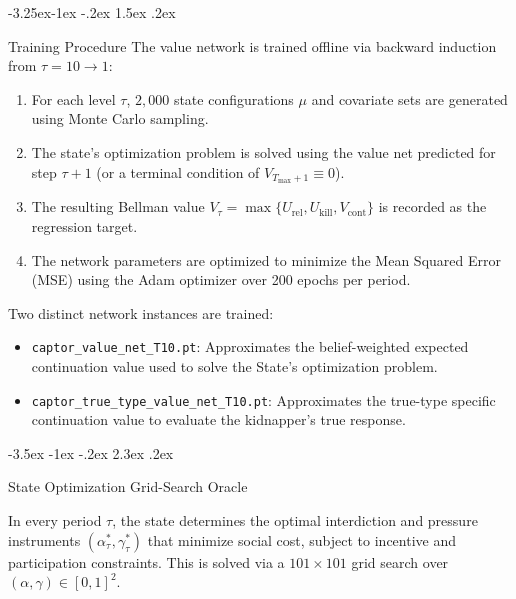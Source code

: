 \documentclass[12pt]{article}
\makeatletter
\newcommand{\pyfile}[1]{\texttt{#1}}
\numberwithin{equation}{section}
\numberwithin{table}{section}
\renewcommand\section{\@startsection {section}{1}{\z@}%
                                   {-3.5ex \@plus -1ex \@minus -.2ex}%
                                   {2.3ex \@plus.2ex}%
                                   {\normalfont\Large\bfseries\raggedright}}
\renewcommand\subsection{\@startsection{subsection}{2}{\z@}%
                                     {-3.25ex\@plus -1ex \@minus -.2ex}%
                                     {1.5ex \@plus .2ex}%
                                     {\normalfont\large\bfseries\raggedright}}
\makeatother
\begin{document}
\subsection{Training Procedure}
The value network is trained offline via backward induction from $\tau = 10 \to 1$:
\begin{enumerate}
    \item For each level $\tau$, $2,000$ state configurations $\mu$ and covariate sets are generated using Monte Carlo sampling.
    \item The state's optimization problem is solved using the value net predicted for step $\tau+1$ (or a terminal condition of $V_{T_{\text{max}}+1} \equiv 0$).
    \item The resulting Bellman value $V_\tau = \max\{U_{\text{rel}}, U_{\text{kill}}, V_{\text{cont}}\}$ is recorded as the regression target.
    \item The network parameters are optimized to minimize the Mean Squared Error (MSE) using the Adam optimizer over 200 epochs per period.
\end{enumerate}

Two distinct network instances are trained:
\begin{itemize}
    \item \pyfile{captor\_value\_net\_T10.pt}: Approximates the belief-weighted expected continuation value used to solve the State's optimization problem.
    \item \pyfile{captor\_true\_type\_value\_net\_T10.pt}: Approximates the true-type specific continuation value to evaluate the kidnapper's true response.
\end{itemize}

\section{State Optimization Grid-Search Oracle}

In every period $\tau$, the state determines the optimal interdiction and pressure instruments $(\alpha_\tau^\ast, \gamma_\tau^\ast)$ that minimize social cost, subject to incentive and participation constraints. This is solved via a $101 \times 101$ grid search over $(\alpha, \gamma) \in [0,1]^2$.
\end{document}
